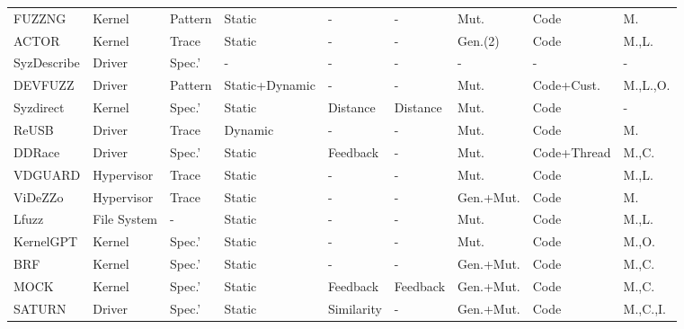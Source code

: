 \begin{footnotesize}
\begin{longtable}{m{1.8cm}m{1.3cm}m{0.6cm}m{1.6cm}m{1.0cm}m{0.8cm}m{0.9cm}m{1.3cm}m{0.5cm}}
        FUZZNG\cite{bulekov2023FUZZNG} & Kernel & Pattern & Static & - & - & Mut. & Code & M. \\
        
        ACTOR\cite{fleischer2023actor} & Kernel & Trace & Static & - & - & Gen.(2) & Code & M.,L. \\
        
        SyzDescribe\cite{hao2023syzdescribe} & Driver & Spec.' & - & - & - & - & - & - \\
        
        DEVFUZZ\cite{wu2023devfuzz} & Driver & Pattern & Static+Dynamic & - & - & Mut. & Code+Cust. & M.,L.,O. \\
        
        Syzdirect\cite{tan2023syzdirect} & Kernel & Spec.' & Static & Distance & Distance & Mut. & Code & - \\
        
        ReUSB\cite{Jang2023ReUSB} & Driver & Trace & Dynamic & - & - & Mut. & Code & M. \\
        
        DDRace\cite{Yuan2023DDRace} & Driver & Spec.' & Static & Feedback & - & Mut. & Code+Thread & M.,C. \\
        
        VDGUARD\cite{Liu2023VDGuard} & Hypervisor & Trace & Static & - & - & Mut. & Code & M.,L. \\

        ViDeZZo\cite{Liu2023ViDeZZoDV} & Hypervisor & Trace & Static & - & - & Gen.+Mut. & Code & M.\\
        
        Lfuzz\cite{Liu2023LFuzz} & File System & - & Static & - & - & Mut. & Code & M.,L. \\

        KernelGPT\cite{yang2023kernelgpt} & Kernel & Spec.' & Static & - & - & Mut. & Code & M.,O. \\

        BRF \cite{Hung2024BRFFT} & Kernel & Spec.' & Static & - & - & Gen.+Mut. & Code & M.,C.\\

        MOCK \cite{Xu2024MOCKOK} & Kernel & Spec.' & Static & Feedback & Feedback & Gen.+Mut. & Code & M.,C.\\

        SATURN\cite{Xu2024Saturn} & Driver & Spec.' & Static & Similarity & - & Gen.+Mut. & Code & M.,C.,I.\\


\end{longtable}
\end{footnotesize}
